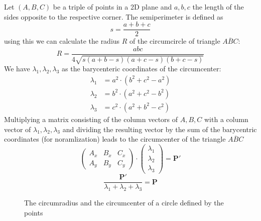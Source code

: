 \documentclass[10pt,twoside]{scrreprt}
\begin{document}
Let $(A,B,C)$ be a triple of points in a 2D plane and $a,b,c$ the length of the sides opposite to the respective corner.
%
The semiperimeter is defined as
%
\begin{equation}
  s = \frac{a+b+c}{2}
\end{equation}
%
using this we can calculate the radius $R$ of the circumcircle of triangle $\overline{ABC}$:
\begin{equation}
  R = \frac{abc}{4\sqrt{s(a+b-s)(a+c-s)(b+c-s)}}
\end{equation}
We have $\lambda_1, \lambda_2, \lambda_3$ as the barycenteric coordinates of the circumcenter:
\begin{align}
  \lambda_1 &= a^2\cdot(b^2+c^2-a^2)\\
  \lambda_2 &= b^2\cdot(a^2+c^2-b^2)\\
  \lambda_3 &= c^2\cdot(a^2+b^2-c^2)
\end{align}
Multiplying a matrix consisting of the column vectors of $A,B,C$ with a column vector of $\lambda_1, \lambda_2, \lambda_3$ and dividing the resulting vector by the sum of the barycentric coordinates (for noramlization) leads to the circumcenter of the triangle $\overline{ABC}$ 
%
\begin{equation}
  \begin{pmatrix}
    A_x & B_x & C_x \\
    A_y & B_y & C_y
  \end{pmatrix} \cdot \begin{pmatrix}
    \lambda_1\\
    \lambda_2\\
    \lambda_3
  \end{pmatrix} = \boldsymbol{P'}
\end{equation}
%
\begin{equation}
  \frac{\boldsymbol{P'}}{\lambda_1+\lambda_2+\lambda_3} = \boldsymbol{P}
\end{equation}
%
\begin{figure}[tb]
\centering
{}
\caption{The circumradius and the circumcenter of a circle defined by the points}
\label{fig:circum_fig}
\end{figure}
\end{document}
